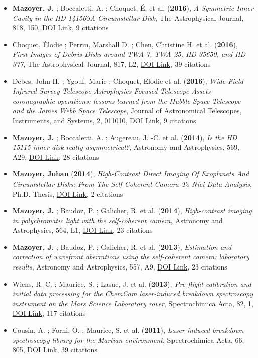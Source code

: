 \documentclass[11pt]{article}
\begin{document}
\begin{itemize}
\item {\bf Mazoyer, J.} ; Boccaletti, A. ; Choquet, {\'E}. et al. ({\bf2016}), {\it A Symmetric Inner Cavity in the HD 141569A Circumstellar Disk}, The Astrophysical Journal, 818, 150, \href{https://doi.org/10.3847/0004-637X/818/2/150}{DOI Link}, 9 citations

\item Choquet, {\'E}lodie ; Perrin, Marshall D. ; Chen, Christine H. et al. ({\bf2016}), {\it First Images of Debris Disks around TWA 7, TWA 25, HD 35650, and HD 377}, The Astrophysical Journal, 817, L2, \href{https://doi.org/10.3847/2041-8205/817/1/L2}{DOI Link}, 39 citations

\item Debes, John H. ; Ygouf, Marie ; Choquet, Elodie et al. ({\bf2016}), {\it Wide-Field Infrared Survey Telescope-Astrophysics Focused Telescope Assets coronagraphic operations: lessons learned from the Hubble Space Telescope and the James Webb Space Telescope}, Journal of Astronomical Telescopes, Instruments, and Systems, 2, 011010, \href{https://doi.org/10.1117/1.JATIS.2.1.011010}{DOI Link}, 9 citations

\item {\bf Mazoyer, J.} ; Boccaletti, A. ; Augereau, J. -C. et al. ({\bf2014}), {\it Is the HD 15115 inner disk really asymmetrical?}, Astronomy and Astrophysics, 569, A29, \href{https://doi.org/10.1051/0004-6361/201424479}{DOI Link}, 28 citations

\item {\bf Mazoyer, Johan} ({\bf2014}), {\it High-Contrast Direct Imaging Of Exoplanets And Circumstellar Disks: From The Self-Coherent Camera To Nici Data Analysis}, Ph.D. Thesis, \href{https://doi.org/10.5281/zenodo.58003}{DOI Link}, 2 citations

\item {\bf Mazoyer, J.} ; Baudoz, P. ; Galicher, R. et al. ({\bf2014}), {\it High-contrast imaging in polychromatic light with the self-coherent camera}, Astronomy and Astrophysics, 564, L1, \href{https://doi.org/10.1051/0004-6361/201423375}{DOI Link}, 23 citations

\item {\bf Mazoyer, J.} ; Baudoz, P. ; Galicher, R. et al. ({\bf2013}), {\it Estimation and correction of wavefront aberrations using the self-coherent camera: laboratory results}, Astronomy and Astrophysics, 557, A9, \href{https://doi.org/10.1051/0004-6361/201321706}{DOI Link}, 23 citations

\item Wiens, R. C. ; Maurice, S. ; Lasue, J. et al. ({\bf2013}), {\it Pre-flight calibration and initial data processing for the ChemCam laser-induced breakdown spectroscopy instrument on the Mars Science Laboratory rover}, Spectrochimica Acta, 82, 1, \href{https://doi.org/10.1016/j.sab.2013.02.003}{DOI Link}, 117 citations

\item Cousin, A. ; Forni, O. ; Maurice, S. et al. ({\bf2011}), {\it Laser induced breakdown spectroscopy library for the Martian environment}, Spectrochimica Acta, 66, 805, \href{https://doi.org/10.1016/j.sab.2011.10.004}{DOI Link}, 39 citations

\end{itemize}
\end{document}

